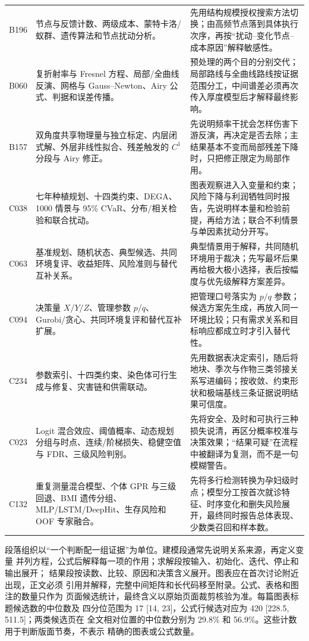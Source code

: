 \begin{longtable}{p{1.4cm}p{5.2cm}p{7.0cm}}
B196 & 节点与反馈计数、两级成本、蒙特卡洛/蚁群、遗传算法和节点扰动分析。 &
先用结构规模授权搜索方法切换；由高频节点落到具体执行次序，再按“扰动--变化节点--成本原因”解释敏感性。\\
B060 & 复折射率与 Fresnel 方程、局部/全曲线反演、网格与 Gauss--Newton、Airy 公式、判据和误差传播。 &
预处理的两个目的分别交代；局部路线与全曲线路线按证据范围分工，中间谱差必须再次传入厚度模型后才解释最终影响。\\
B157 & 双角度共享物理量与独立标定、内层闭式解、外层非线性拟合、残差触发的 $C^1$ 分段与 Airy 修正。 &
先说明频率干扰会怎样伤害下游反演，再决定是否去除；主结果基本不变而局部残差下降时，只把修正限定为局部作用。\\
C038 & 七年种植规划、十四类约束、DEGA、1000 情景与 95\% CVaR、分布/相关检验和联合扰动。 &
图表观察进入入变量和约束；风险下降与利润牺牲同时报告，先说明样本量和检验前提，再给方法；联合不利情景与单因素扰动分开写。\\
C063 & 基准规划、随机状态、典型候选、共同环境复评、收益矩阵、风险准则与替代互补关系。 &
典型情景用于解释，共同随机环境用于裁决；先写最坏后果再给极大极小选择，表后按幅度与优先级解释方案差异。\\
C094 & 决策量 $X/Y/Z$、管理参数 $p/q$、Gurobi/贪心、共同环境复评和替代互补扩展。 &
把管理口号落实为 $p/q$ 参数；候选方案先生成，再放入同一环境比较；只有需求关系和目标响应都成立时才引入替代性。\\
C234 & 参数索引、十四类约束、染色体可行生成与修复、灾害链和供需联动。 &
先用数据表决定索引，随后将地块、季次与作物三类邻接关系写进编码；按收敛、约束形状和极端基线三条证据说明结果可信度。\\
C023 & Logit 混合效应、阈值概率、动态规划分组与时点、连续/阶梯损失、稳健空值与 FDR、三级风险判别。 &
先将安全、及时和可执行三种损失说清，再区分概率校准与决策效果；“结果可疑”在流程中被翻译为复测，而不是一句模糊警告。\\
C132 & 重复测量混合模型、个体 GPR 与三级回退、BMI 遗传分组、MLP/LSTM/DeepHit、生存风险和 OOF 专家融合。 &
先将多行检测转换为孕妇级时点；模型分工按首次就诊特征、时序变化和删失风险展开，最终同时报告总体表现、少数类召回和样本数。\\
\bottomrule
\end{longtable}

段落组织以“一个判断配一组证据”为单位。建模段通常先说明关系来源，再定义变量
并列方程，公式后解释每一项的作用；求解段按输入、初始化、迭代、停止和输出展开；
结果段按读数、比较、原因和决策含义展开。图表应在首次讨论附近出现，正文必须
引用并解释，完整中间矩阵和长代码移至附录。公式、表格和图注的数量只作为
页面候选统计，最终含义以原始页面裁剪核验为准。每篇图表标题候选数的中位数及
四分位范围为 17 [14, 23]，公式行候选对应为 420 [228.5, 511.5]；两类候选页在
全文相对位置的中位数分别为 29.8\% 和 56.9\%。这些计数用于判断版面节奏，不表示
精确的图表或公式数量。

